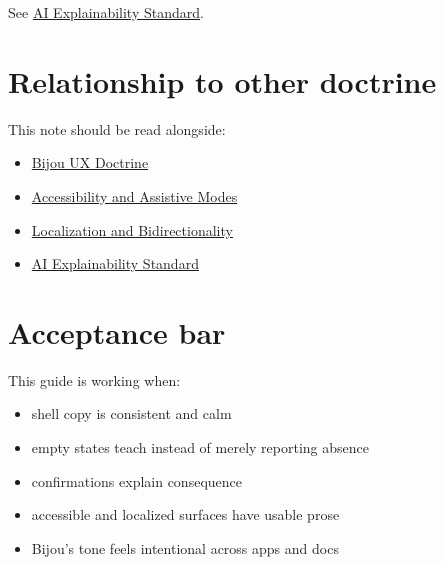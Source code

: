 See \href{https://github.com/flyingrobots/bijou/blob/cbd70612140e7a450d764b3c7be1c6af878b99bc/docs/strategy/ai-explainability-standard.md}{AI Explainability Standard}.

\section{Relationship to other doctrine}\label{record-040-relationship-to-other-doctrine}

This note should be read alongside:

\begin{itemize}
\tightlist
\item
  \href{https://github.com/flyingrobots/bijou/blob/cbd70612140e7a450d764b3c7be1c6af878b99bc/docs/strategy/bijou-ux-doctrine.md}{Bijou UX Doctrine}
\item
  \href{https://github.com/flyingrobots/bijou/blob/cbd70612140e7a450d764b3c7be1c6af878b99bc/docs/strategy/accessibility-and-assistive-modes.md}{Accessibility and Assistive Modes}
\item
  \href{https://github.com/flyingrobots/bijou/blob/cbd70612140e7a450d764b3c7be1c6af878b99bc/docs/strategy/localization-and-bidirectionality.md}{Localization and Bidirectionality}
\item
  \href{https://github.com/flyingrobots/bijou/blob/cbd70612140e7a450d764b3c7be1c6af878b99bc/docs/strategy/ai-explainability-standard.md}{AI Explainability Standard}
\end{itemize}

\section{Acceptance bar}\label{record-040-acceptance-bar}

This guide is working when:

\begin{itemize}
\tightlist
\item
  shell copy is consistent and calm
\item
  empty states teach instead of merely reporting absence
\item
  confirmations explain consequence
\item
  accessible and localized surfaces have usable prose
\item
  Bijou's tone feels intentional across apps and docs
\end{itemize}

